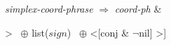 \documentclass[varwidth]{standalone}
\begin{document}
\textit{simplex-coord-phrase} $\Rightarrow$ \textit{coord-ph} \& \\
\begin{avm}
[dtrs & <[conj & nil]> \, $\oplus$ list($sign$) \, $\oplus$ <[conj & $\neg$nil] >]
 \end{avm}
\end{document}
